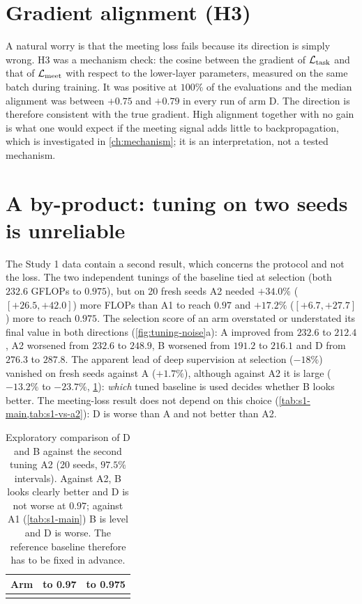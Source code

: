 \section{Gradient alignment (H3)}\label{sec:h3}
A natural worry is that the meeting loss fails because its direction is simply wrong. H3 was a mechanism check: the cosine between the gradient of $\mathcal{L}_{\mathrm{task}}$ and that of $\mathcal{L}_{\mathrm{meet}}$ with respect to the lower-layer parameters, measured on the same batch during training. It was positive at $100\%$ of the evaluations and the median alignment was between $+0.75$ and $+0.79$ in every run of arm D. The direction is therefore consistent with the true gradient. High alignment together with no gain is what one would expect if the meeting signal adds little to backpropagation, which is investigated in \cref{ch:mechanism}; it is an interpretation, not a tested mechanism.

\section{A by-product: tuning on two seeds is unreliable}\label{sec:noise}
The Study 1 data contain a second result, which concerns the protocol and not the loss. The two independent tunings of the baseline tied at selection (both $232.6$ GFLOPs to $0.975$), but on 20 fresh seeds A2 needed $+34.0\%$ ($[+26.5,+42.0]$) more FLOPs than A1 to reach $0.97$ and $+17.2\%$ ($[+6.7,+27.7]$) more to reach $0.975$. The selection score of an arm overstated or understated its final value in both directions (\cref{fig:tuning-noise}a): A improved from $232.6$ to $212.4$, A2 worsened from $232.6$ to $248.9$, B worsened from $191.2$ to $216.1$ and D from $276.3$ to $287.8$. The apparent lead of deep supervision at selection ($-18\%$) vanished on fresh seeds against A ($+1.7\%$), although against A2 it is large ($-13.2\%$ to $-23.7\%$, \cref{tab:s1-vs-a2}): \emph{which} tuned baseline is used decides whether B looks better. The meeting-loss result does not depend on this choice (\cref{tab:s1-main,tab:s1-vs-a2}): D is worse than A and not better than A2.

\begin{table}[t]
\centering\small
\caption{Exploratory comparison of D and B against the second tuning A2 (20 seeds, $97.5\%$ intervals). Against A2, B looks clearly better and D is not worse at $0.97$; against A1 (\cref{tab:s1-main}) B is level and D is worse. The reference baseline therefore has to be fixed in advance.}
\label{tab:s1-vs-a2}
\begin{tabular}{@{}l l l@{}}
\toprule
Arm & to 0.97 & to 0.975\\
\midrule
\\
\bottomrule
\end{tabular}
\end{table}

